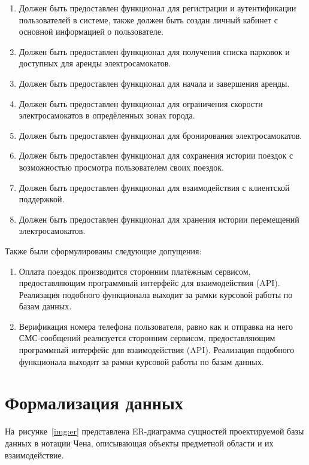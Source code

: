 \begin{enumerate}
    \item Должен быть предоставлен функционал для регистрации и аутентификации пользователей в системе, также должен быть создан личный кабинет с основной информацией о пользователе.
    \item Должен быть предоставлен функционал для получения списка парковок и доступных для аренды электросамокатов.
    \item Должен быть предоставлен функционал для начала и завершения аренды.
    \item Должен быть предоставлен функционал для ограничения скорости электросамокатов в опредёленных зонах города.
    \item Должен быть предоставлен функционал для бронирования электросамокатов.
    \item Должен быть предоставлен функционал для сохранения истории поездок с возможностью просмотра пользователем своих поездок.
    \item Должен быть предоставлен функционал для взаимодействия с клиентской поддержкой.
    \item Должен быть предоставлен функционал для хранения истории перемещений электросамокатов.
\end{enumerate}

Также были сформулированы следующие допущения:

\begin{enumerate}
    \item Оплата поездок производится сторонним платёжным сервисом, предоставляющим программный интерфейс для взаимодействия (API). Реализация подобного функционала выходит за рамки курсовой работы по базам данных.
    \item Верификация номера телефона пользователя, равно как и отправка на него СМС-сообщений реализуется сторонним сервисом, предоставляющим программный интерфейс для взаимодействия (API). Реализация подобного функционала выходит за рамки курсовой работы по базам данных.
\end{enumerate}

\section{Формализация данных}

На~рисунке~\ref{img:er} представлена ER-диаграмма сущностей проектируемой базы данных в нотации Чена, описывающая объекты предметной области и их взаимодействие.

